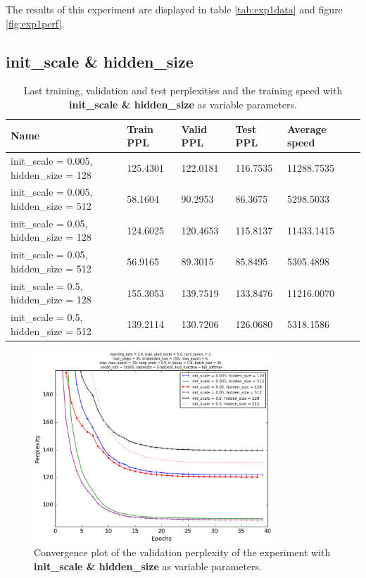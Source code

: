 \documentclass[10pt,a4paper,titlepage]{article}
\begin{document}
The results of this experiment are displayed in table \ref{tab:exp1data} and figure \ref{fig:exp1perf}.

\newpage

\subsection{init\_scale \& hidden\_size}

\begin{table}[H]
\centering
\caption{Last training, validation and test perplexities and the training speed with \textbf{init\_scale \& hidden\_size} as variable parameters.}
\label{tab:exp2data}
\begin{tabular}{|l|l|l|l|l|l|}
\hline
{\small Name} & {\small Train PPL} & {\small Valid PPL} & {\small Test PPL} & {\small Average speed}\\ \hline
{\small init\_scale = 0.005, hidden\_size = 128}         & 125.4301   & 122.0181   & 116.7535   & 11288.7535 \\ \hline
{\small init\_scale = 0.005, hidden\_size = 512}         & 58.1604    & 90.2953    & 86.3675    & 5298.5033  \\ \hline
{\small init\_scale = 0.05, hidden\_size = 128}          & 124.6025   & 120.4653   & 115.8137   & 11433.1415 \\ \hline
{\small init\_scale = 0.05, hidden\_size = 512}          & 56.9165    & 89.3015    & 85.8495    & 5305.4898  \\ \hline
{\small init\_scale = 0.5, hidden\_size = 128}           & 155.3053   & 139.7519   & 133.8476   & 11216.0070 \\ \hline
{\small init\_scale = 0.5, hidden\_size = 512}           & 139.2114   & 130.7206   & 126.0680   & 5318.1586  \\ \hline
\end{tabular}
\end{table}

\begin{figure}[H]
	\begin{center}
		\includegraphics[width=0.80\textwidth]{Figures/inithiddenperf.eps}
		\caption{Convergence plot of the validation perplexity of the experiment with \textbf{init\_scale \& hidden\_size} as variable parameters. }
		\label{fig:exp2perf}
	\end{center}	
\end{figure}
\end{document}
